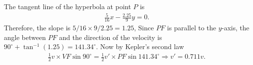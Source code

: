 \documentclass{article}
\begin{document}
\begin{enumerate}
  The tangent line of the hyperbola at point $P$ is
  \begin{align*}
    \frac{5}{16}x - \frac{2.25}{9}y = 0.
  \end{align*}
  Therefore, the slope is $5/16\times 9/2.25 = 1.25$, Since $PF$ is parallel to the $y$-axis, the angle between $PF$ and the direction of the velocity is $90^\circ + \tan ^{-1}(1.25) = 141.34^\circ$. Now by Kepler's second law
  \begin{align*}
   \frac{1}{2}v\times VF \sin 90^\circ = \frac{1}{2} v' \times  PF \sin 141.34^\circ\Rightarrow v' = 0.711v.
  \end{align*}

   \begin{figure}[ht]
    \centering
  \end{figure}

  
\end{enumerate}
\end{document}
